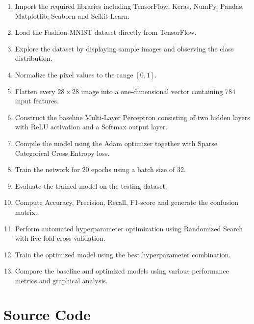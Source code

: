 \documentclass[12pt,a4paper]{article}
\begin{document}
\begin{enumerate}

\item Import the required libraries including TensorFlow, Keras, NumPy, Pandas, Matplotlib, Seaborn and Scikit-Learn.

\item Load the Fashion-MNIST dataset directly from TensorFlow.

\item Explore the dataset by displaying sample images and observing the class distribution.

\item Normalize the pixel values to the range $[0,1]$.

\item Flatten every $28 \times 28$ image into a one-dimensional vector containing 784 input features.

\item Construct the baseline Multi-Layer Perceptron consisting of two hidden layers with ReLU activation and a Softmax output layer.

\item Compile the model using the Adam optimizer together with Sparse Categorical Cross Entropy loss.

\item Train the network for 20 epochs using a batch size of 32.

\item Evaluate the trained model on the testing dataset.

\item Compute Accuracy, Precision, Recall, F1-score and generate the confusion matrix.

\item Perform automated hyperparameter optimization using Randomized Search with five-fold cross validation.

\item Train the optimized model using the best hyperparameter combination.

\item Compare the baseline and optimized models using various performance metrics and graphical analysis.

\end{enumerate}

\section{Source Code}
\end{document}
